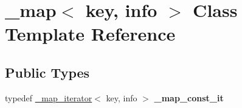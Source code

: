 \hypertarget{class__map}{}\section{\+\_\+map$<$ key, info $>$ Class Template Reference}
\label{class__map}
\subsection*{Public Types}
\begin{DoxyCompactItemize}
\item 
\mbox{\label{class__map_a7b43eef98f5e13320021092b78bc059e}} 
typedef \mbox{\hyperlink{class__map__iterator}{\+\_\+map\+\_\+iterator}}$<$ key, info $>$ {\bfseries \+\_\+map\+\_\+const\+\_\+it}
\end{DoxyCompactItemize}
